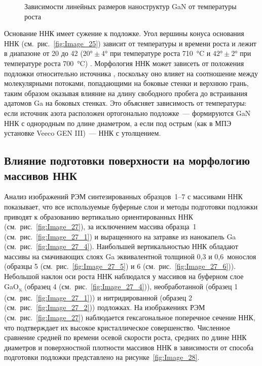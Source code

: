 \begin{figure}[ht]  \caption{Зависимости
линейных размеров наноструктур GaN от температуры роста}\label{fig:Image_26_2}
\end{figure}

Основание ННК имеет сужение к подложке. Угол вершины конуса основания ННК
(см.~рис.~\cref{fig:Image_25}) зависит от температуры и времени роста и лежит в
диапазоне от 20{\textdegree} до 42{\textdegree} (\(20\si{\degree} \pm
4\si{\degree}\) при температуре роста 710~\si{\degreeCelsius} и
\(42\si{\degree} \pm 2\si{\degree}\) при температуре роста
700~\si{\degreeCelsius}) \cite{Bolshakov2014}. Морфология ННК может зависеть от
положения подложки относительно источника \cite{Galopin2011}, поскольку оно
влияет на соотношение между молекулярными потоками, попадающими на боковые
стенки и верхнюю грань, таким образом оказывая влияние на длину свободного
пробега до встраивания адатомов Ga на боковых стенках. Это объясняет
зависимость от температуры: если источник азота расположен ортогонально
подложке~--- формируются GaN ННК с однородным по длине диаметром, а если под
острым (как в МПЭ установке Veeco GEN III)~--- ННК с утолщением.

\subsection{Влияние подготовки поверхности на морфологию массивов ННК}\label{sec:ch3/sec2/sub5}

Анализ изображений РЭМ синтезированных образцов~1--7 с массивами ННК
показывает, что все используемые буферные слои и методы подготовки подложки
приводят к образованию вертикально ориентированных ННК
(см.~рис.~\cref{fig:Image_27}), за исключением массива образца~1
(см.~рис.~\cref{fig:Image_27_1}) и выращенного на затравке из нанокапель Ga
(см.~рис.~\cref{fig:Image_27_4}). Наибольшей вертикальностью ННК обладают
массивы на смачивающих слоях Ga эквивалентной толщиной 0,3 и 0,6~монослоя
(образцы 5 (см.~рис.~\cref{fig:Image_27_5}) и 6
(см.~рис.~\cref{fig:Image_27_6})). Небольшой наклон оси роста ННК наблюдался у
массивов на буферном слое GaO\textsubscript{x} (образец 4
(см.~рис.~\cref{fig:Image_27_4})), необработанной (образец 1
(см.~рис.~\cref{fig:Image_27_1})) и нитридированной (образец 2
(см.~рис.~\cref{fig:Image_27_2})) подложках. На изображениях РЭМ
(см.~рис.~\cref{fig:Image_27}) наблюдается гексагональное поперечное сечение
ННК, что подтверждает их высокое кристаллическое совершенство. Численное
сравнение средней по времени осевой скорости роста, средних по длине ННК
диаметров и поверхностной плотности массивов ННК в зависимости от способа
подготовки подложки представлено на рисунке~\cref{fig:Image_28}.

